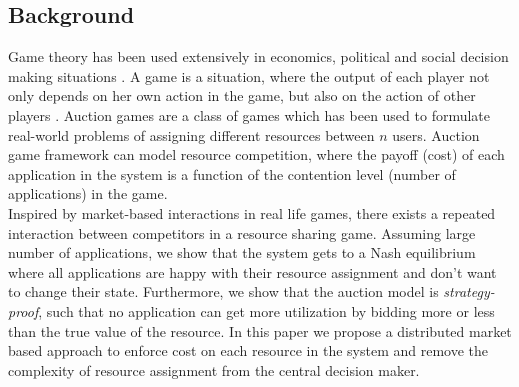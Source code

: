 \subsection{Background}
Game theory has been used extensively in economics, political and social decision making situations \cite{tootaghaj2011game, tootaghaj2011risk, kotobi2017spectrum, kotobi2015introduction, kesidis2013distributed, kurve2013agent, wang2017using, wang2015recouping}. A game is a situation, where the output of each player not only depends on her own action in the game, but also on the action of other players \cite{osborne1994course}. Auction games are a class of games which has been used to formulate real-world problems of assigning different resources between $n$ users. Auction game framework can model resource competition, where the payoff (cost) of each application in the system is a function of the contention level (number of applications) in the game.\\
\indent Inspired by market-based interactions in real life games, there exists a repeated interaction between competitors in a resource sharing game. Assuming large number of applications, we show that the system gets to a Nash equilibrium where all applications are happy with their resource assignment and don't want to change their state. Furthermore, we show that the auction model is \textit{strategy-proof}, such that no application can get more utilization by bidding more or less than the true value of the resource. In this paper we propose a distributed market based approach to enforce cost on each resource in the system and remove the complexity of resource assignment from the central decision maker.\\ 
